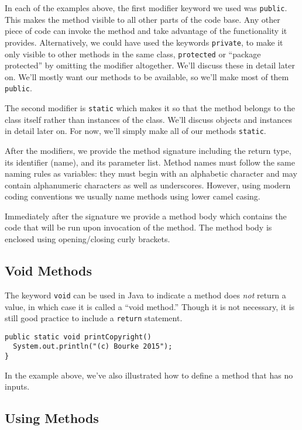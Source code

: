 In each of the examples above, the first modifier keyword we
used was \texttt{public}.  This makes the method visible
to all other parts of the code base.  Any other piece of code can
invoke the method and take advantage of the functionality it
provides.  Alternatively, we could have used the keywords 
\texttt{private}, to make it only visible to other methods
in the same class, \texttt{protected} or ``package
protected'' by omitting the modifier altogether.  We'll discuss
these in detail later on.  We'll mostly want our methods to
be available, so we'll make most of them \texttt{public}.

The second modifier is \texttt{static} which makes it
so that the method belongs to the class itself rather than instances
of the class.  We'll discuss objects and instances in detail later
on.  For now, we'll simply make all of our methods \texttt{static}.

After the modifiers, we provide the method signature including 
the return type, its identifier (name), and its parameter list.
Method names must follow the same naming rules as variables: 
they must begin with an alphabetic character and may contain 
alphanumeric characters as well as underscores.  However, 
using modern coding conventions  we usually name methods 
using lower camel casing.

Immediately after the signature we provide a method body which
contains the code that will be run upon invocation of the method.
The method body is enclosed using opening/closing curly brackets.

\subsection{Void Methods}

The keyword \texttt{void} can be used in Java to indicate
a method does \emph{not} return a value, in which case it is
called a ``void method.''  Though it is not necessary, it is still
good practice to include a \texttt{return} statement.

\begin{verbatim}
public static void printCopyright()
  System.out.println("(c) Bourke 2015");
}
\end{verbatim}

In the example above, we've also illustrated how to define a 
method that has no inputs.  

\subsection{Using Methods}

